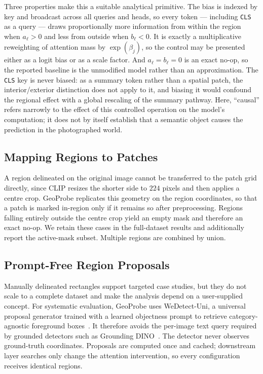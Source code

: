 Three properties make this a suitable analytical primitive. The bias is
indexed by key and broadcast across all queries and heads, so every token
--- including \texttt{CLS} as a query --- draws proportionally more
information from within the region when $a_\ell > 0$ and less from outside
when $b_\ell < 0$. It is exactly a multiplicative reweighting of attention
mass by $\exp(\beta_j)$, so the control may be presented either as a logit
bias or as a scale factor. And $a_\ell = b_\ell = 0$ is an exact no-op, so
the reported baseline is the unmodified model rather than an approximation.
The \texttt{CLS} key is never biased: as a summary token rather than a
spatial patch, the interior/exterior distinction does not apply to it, and
biasing it would confound the regional effect with a global rescaling of the
summary pathway.
Here, ``causal'' refers narrowly to the effect of this controlled operation on
the model's computation; it does not by itself establish that a semantic object
causes the prediction in the photographed world.

\subsection{Mapping Regions to Patches}

A region delineated on the original image cannot be transferred to the patch
grid directly, since CLIP resizes the shorter side to $224$ pixels and then
applies a centre crop. GeoProbe replicates this geometry on the region
coordinates, so that a patch is marked in-region only if it remains so after
preprocessing. Regions falling entirely outside the centre crop yield an
empty mask and therefore an exact no-op. We retain these cases in the
full-dataset results and additionally report the active-mask subset. Multiple
regions are combined by union.

\subsection{Prompt-Free Region Proposals}

Manually delineated rectangles support targeted case studies, but they do
not scale to a complete dataset and make the analysis depend on a
user-supplied concept. For systematic evaluation, GeoProbe uses WeDetect-Uni,
a universal proposal generator trained with a learned objectness prompt to
retrieve category-agnostic foreground boxes~\cite{fu2026wedetect}. It
therefore avoids the per-image text query required by grounded detectors such
as Grounding DINO~\cite{liu2024grounding}. The detector
never observes ground-truth coordinates. Proposals are computed once and
cached; downstream layer searches only change the attention intervention, so
every configuration receives identical regions.

